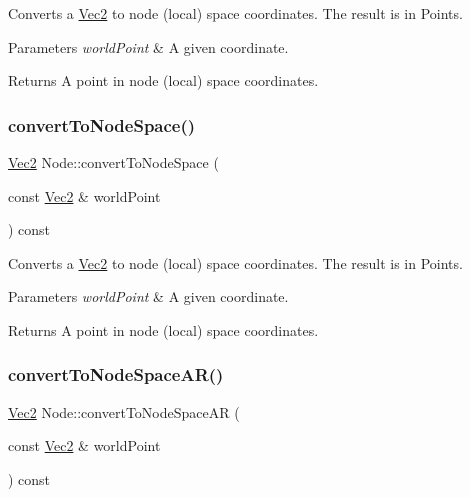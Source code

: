 Converts a \hyperlink{classVec2}{Vec2} to node (local) space coordinates. The result is in Points.


\begin{DoxyParams}{Parameters}
{\em world\+Point} & A given coordinate. \\
\hline
\end{DoxyParams}
\begin{DoxyReturn}{Returns}
A point in node (local) space coordinates. 
\end{DoxyReturn}
\mbox{\label{classNode_ae7bffc192b6e9b24871108d472a0e85a}} 
\subsubsection{\texorpdfstring{convert\+To\+Node\+Space()}{convertToNodeSpace()}\hspace{0.1cm}{\footnotesize\ttfamily [2/2]}}
{\footnotesize\ttfamily \hyperlink{classVec2}{Vec2} Node\+::convert\+To\+Node\+Space (\begin{DoxyParamCaption}\item[{const \hyperlink{classVec2}{Vec2} \&}]{world\+Point }\end{DoxyParamCaption}) const}

Converts a \hyperlink{classVec2}{Vec2} to node (local) space coordinates. The result is in Points.


\begin{DoxyParams}{Parameters}
{\em world\+Point} & A given coordinate. \\
\hline
\end{DoxyParams}
\begin{DoxyReturn}{Returns}
A point in node (local) space coordinates. 
\end{DoxyReturn}
\mbox{\label{classNode_a9c7e573a38882cc0727c5f8f65cd9187}} 
\subsubsection{\texorpdfstring{convert\+To\+Node\+Space\+A\+R()}{convertToNodeSpaceAR()}\hspace{0.1cm}{\footnotesize\ttfamily [1/2]}}
{\footnotesize\ttfamily \hyperlink{classVec2}{Vec2} Node\+::convert\+To\+Node\+Space\+AR (\begin{DoxyParamCaption}\item[{const \hyperlink{classVec2}{Vec2} \&}]{world\+Point }\end{DoxyParamCaption}) const}

